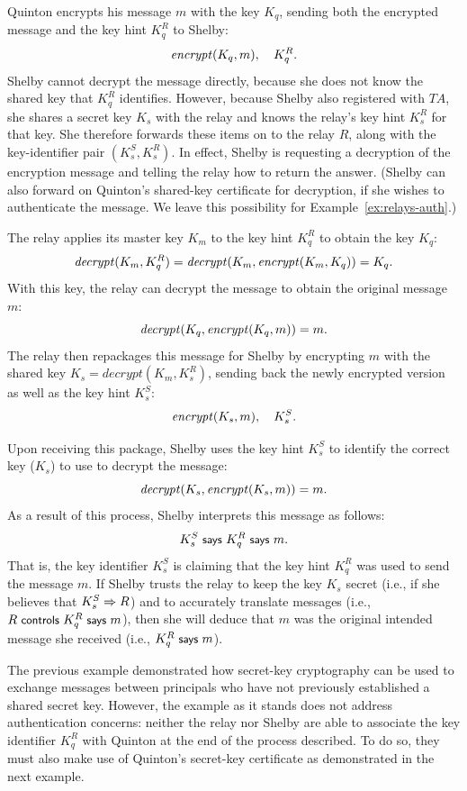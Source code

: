 \begin{example}
  Quinton encrypts his message $m$ with the key $K_q$, sending both the
  encrypted message and the key hint $K_q^R$ to Shelby:
  \[ \encrypt{m}{K_q}, \quad K_q^R. \] Shelby cannot decrypt the message
  directly, because she does not know the shared key that $K_q^R$
  identifies.  However, 
  because Shelby also registered with $TA$, she shares a secret key
  $K_s$ with the relay and knows the relay's key hint $K_s^R$ for that
  key.  She therefore forwards these items on to the relay $R$, along
  with the key-identifier pair $(K_s^S,K_s^R)$.  In effect, Shelby is
  requesting a decryption of the encryption message and telling the
  relay how to return the answer.  (Shelby can also forward on Quinton's
  shared-key certificate for decryption, if she wishes to authenticate
  the message.  We leave this possibility for Example~\ref{ex:relays-auth}.) 

  The relay applies its master key $K_m$ to the key hint $K_q^R$ to
  obtain the key $K_q$:
  \[ \mathit{decrypt}(K_m, K_q^R) = \mathit{decrypt}(K_m,
  \encrypt{K_q}{K_m}) = K_q. \] 
  With this key, the relay can decrypt the message  to
  obtain the original message $m$:
  \[ \mathit{decrypt}(K_q, \encrypt{m}{K_q}) = m . \] 
  The relay then repackages this message for Shelby by encrypting $m$
  with the shared key $K_s = \mathit{decrypt}(K_m, K_s^R)$, sending back
  the newly encrypted version as well as the key hint $K_s^S$:
  \[ \encrypt{m}{K_s}, \quad K_s^S. \]

  Upon receiving this package, Shelby uses the key hint $K_s^S$ to
  identify the correct key ($K_s$) to use to decrypt the message:
  \[ \mathit{decrypt}(K_s, \encrypt{m}{K_s}) = m.  \]
  As a result of this process, Shelby interprets this message as follows:
  \[ K_s^S \says K_q^R \says m. \]
  That is, the key identifier $K_s^S$ is claiming that the key hint
  $K_q^R$ was used to send the message $m$.  If Shelby trusts the relay
  to keep the key $K_s$ secret (i.e., if she believes that $K_s^S
  \speaksfor R$) and to accurately translate messages (i.e., $R
  \controls K_q^R \says m$), then she will deduce that $m$ was the
  original intended message she received (i.e., $K_q^R \says m$).
\end{example}

The previous example demonstrated how secret-key cryptography can be
used to exchange messages between principals who have not previously
established a shared secret key.  However, the example as it stands does
not address authentication concerns: neither the relay nor Shelby are
able to associate the key identifier $K_q^R$ with Quinton at the end of
the process described.  To do so, they must also make use of Quinton's
secret-key certificate as demonstrated in the next example. 


